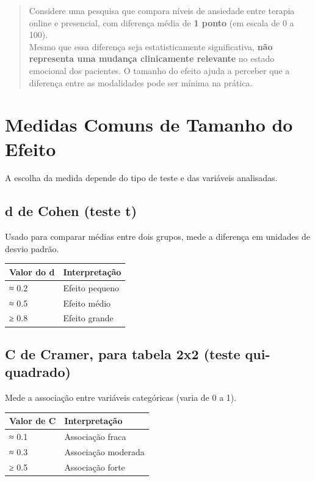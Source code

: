 \documentclass[
]{book}
\begin{document}
\begin{quote}
Considere uma pesquisa que compara níveis de ansiedade entre terapia online e presencial, com diferença média de \textbf{1 ponto} (em escala de 0 a 100).\\
Mesmo que essa diferença seja estatisticamente significativa, \textbf{não representa uma mudança clinicamente relevante} no estado emocional dos pacientes. O tamanho do efeito ajuda a perceber que a diferença entre as modalidades pode ser mínima na prática.
\end{quote}

\section{Medidas Comuns de Tamanho do Efeito}\label{medidas-comuns-de-tamanho-do-efeito}

A escolha da medida depende do tipo de teste e das variáveis analisadas.

\subsection{d de Cohen (teste t)}\label{d-de-cohen-teste-t}

Usado para comparar médias entre dois grupos, mede a diferença em unidades de desvio padrão.

\begin{longtable}[]{@{}ll@{}}
\toprule\noalign{}
Valor do d & Interpretação \\
\midrule\noalign{}
\endhead
\bottomrule\noalign{}
\endlastfoot
≈ 0.2 & Efeito pequeno \\
≈ 0.5 & Efeito médio \\
≥ 0.8 & Efeito grande \\
\end{longtable}

\subsection{C de Cramer, para tabela 2x2 (teste qui-quadrado)}\label{c-de-cramer-para-tabela-2x2-teste-qui-quadrado}

Mede a associação entre variáveis categóricas (varia de 0 a 1).

\begin{longtable}[]{@{}ll@{}}
\toprule\noalign{}
Valor de C & Interpretação \\
\midrule\noalign{}
\endhead
\bottomrule\noalign{}
\endlastfoot
≈ 0.1 & Associação fraca \\
≈ 0.3 & Associação moderada \\
≥ 0.5 & Associação forte \\
\end{longtable}
\end{document}
